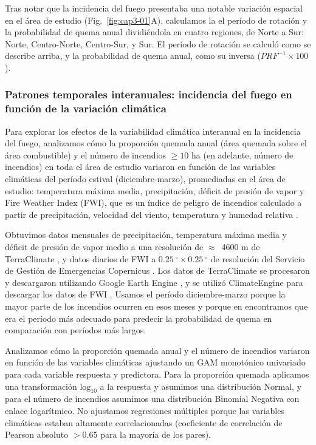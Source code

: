 Tras notar que la incidencia del fuego presentaba una notable variación espacial en el área de estudio (Fig.~\ref{fig:cap3-01}A), calculamos la el período de rotación y la probabilidad de quema anual dividiéndola en cuatro regiones, de Norte a Sur: Norte, Centro-Norte, Centro-Sur, y Sur. El período de rotación se calculó como se describe arriba, y la probabilidad de quema anual, como su inversa ($PRF^{-1} \times 100$).

\subsubsection{Patrones temporales interanuales: incidencia del fuego en función de la variación climática}

Para explorar los efectos de la variabilidad climática interanual en la incidencia del fuego, analizamos cómo la proporción quemada anual (área quemada sobre el área combustible) y el número de incendios $\ge 10$ ha (en adelante, número de incendios) en toda el área de estudio variaron en función de las variables climáticas del período estival (diciembre-marzo), promediadas en el área de estudio: temperatura máxima media, precipitación, déficit de presión de vapor y Fire Weather Index (FWI), que es un índice de peligro de incendios calculado a partir de precipitación, velocidad del viento, temperatura y humedad relativa \citep{van_wagner_development_1987}.

Obtuvimos datos mensuales de precipitación, temperatura máxima media y déficit de presión de vapor medio a una resolución de $\approx$~4600 m de TerraClimate \citep{abatzoglou_terraclimate_2018}, y datos diarios de FWI a $0.25\ ^\circ \times 0.25\ ^\circ$ de resolución del Servicio de Gestión de Emergencias Copernicus \citep{vitolo_era5-based_2020}. Los datos de TerraClimate se procesaron y descargaron utilizando Google Earth Engine \citep{gorelick_google_2017}, y se utilizó ClimateEngine para descargar los datos de FWI \citep{huntington_climate_2017}. Usamos el período diciembre-marzo porque la mayor parte de los incendios ocurren en esos meses y porque en \citet{kitzberger_projections_2022} encontramos que era el período más adecuado para predecir la probabilidad de quema en comparación con períodos más largos.

Analizamos cómo la proporción quemada anual y el número de incendios variaron en función de las variables climáticas ajustando un GAM monotónico univariado para cada variable respuesta y predictora. Para la proporción quemada aplicamos una transformación $\text{log}_{10}$ a la respuesta y asumimos una distribución Normal, y para el número de incendios asumimos una distribución Binomial Negativa con enlace logarítmico. No ajustamos regresiones múltiples porque las variables climáticas estaban altamente correlacionadas (coeficiente de correlación de Pearson absoluto $> 0.65$ para la mayoría de los pares).

